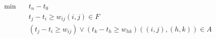 \begin{align}
  \min\quad & t_{n} - t_{0} \tag{eq\_0001\_a} \\
  & t_{j} - t_{i} \geq w_{\mathit{ij}} \left(i , j\right) \in F \tag{eq\_0001\_b} \\
  & \left(t_{j} - t_{i} \geq w_{\mathit{ij}}\right) \vee \left(t_{k} - t_{h} \geq w_{\mathit{hk}}\right) \left(\left(i , j\right) , \left(h , k\right)\right) \in A \tag{eq\_0001\_c} \\
\end{align}
